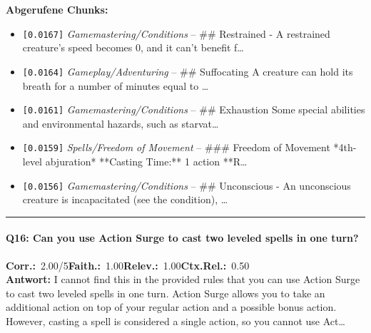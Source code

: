\noindent\textbf{Abgerufene Chunks:}
\begin{itemize}[noitemsep, topsep=2pt]
  \item[\textbf{\#1}] \texttt{[0.0167]} \textit{Gamemastering/Conditions} -- \#\# Restrained  - A restrained creature's speed becomes 0, and it can't benefit f\ldots
  \item[\textbf{\#2}] \texttt{[0.0164]} \textit{Gameplay/Adventuring} -- \#\# Suffocating  A creature can hold its breath for a number of minutes equal to \ldots
  \item[\textbf{\#3}] \texttt{[0.0161]} \textit{Gamemastering/Conditions} -- \#\# Exhaustion  Some special abilities and environmental hazards, such as starvat\ldots
  \item[\textbf{\#4}] \texttt{[0.0159]} \textit{Spells/Freedom of Movement} -- \#\#\# Freedom of Movement  *4th-level abjuration*  **Casting Time:** 1 action  **R\ldots
  \item[\textbf{\#5}] \texttt{[0.0156]} \textit{Gamemastering/Conditions} -- \#\# Unconscious  - An unconscious creature is incapacitated (see the condition), \ldots
\end{itemize}
\vspace{4pt}
\hrule
\vspace{6pt}

\paragraph{Q16: Can you use Action Surge to cast two leveled spells in one turn?}
\noindent \textbf{Corr.:}~2.00/5\quad \textbf{Faith.:}~1.00\quad \textbf{Relev.:}~1.00\quad \textbf{Ctx.Rel.:}~0.50\\

\noindent\textbf{Antwort:} I cannot find this in the provided rules that you can use Action Surge to cast two leveled spells in one turn. Action Surge allows you to take an additional action on top of your regular action and a possible bonus action. However, casting a spell is considered a single action, so you cannot use Act\ldots

